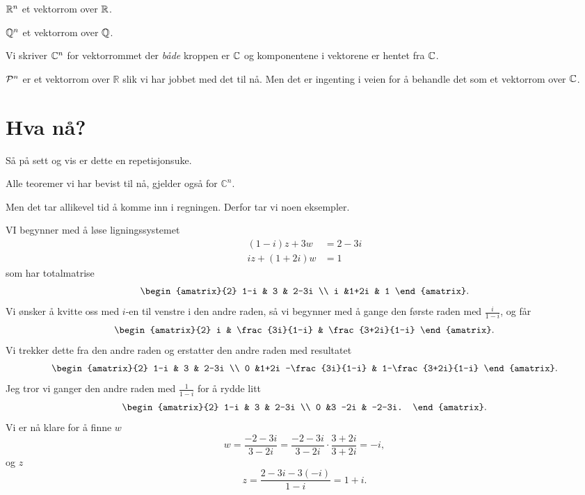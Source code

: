 \begin{ex}
$\R^n$ et vektorrom over $\R$.
\end{ex}
\begin{ex}
$\Q^n$ et vektorrom over $\Q$.
\end{ex}
\begin{ex}
Vi skriver $\C^n$ for vektorrommet der \emph{både} kroppen er $\C$ og komponentene i vektorene er hentet fra $\C$.
\end{ex}
\begin{ex}
$\P^n$ er et vektorrom over $\mathbb R$ slik vi har jobbet med det til nå. 
Men det er ingenting i veien for å behandle det som et vektorrom over $\C$.
\end{ex}





\section*{Hva nå?}


Så på sett og vis er dette en repetisjonsuke. 

\begin{thm}
Alle teoremer vi har bevist til nå, gjelder også for $\mathbb C^n$. 
\end{thm}

Men det tar allikevel tid å komme inn i regningen. Derfor tar vi noen eksempler.

\begin{ex}
VI begynner med å løse ligningssystemet
\begin{align*}
(1-i) z + 3w   &= 2-3i \\
i z + (1+2i) w &= 1
\end{align*}
som har totalmatrise
\[
\begin{amatrix}{2}
1-i & 3 & 2-3i \\ i &1+2i & 1
\end{amatrix}.
\]
Vi ønsker å kvitte oss med $i$-en til venstre i den andre raden, så vi begynner med å gange den første raden med $\frac{i}{1-i}$, og får
\[
\begin{amatrix}{2}
i & \frac{3i}{1-i} & \frac{3+2i}{1-i} 
\end{amatrix}.
\]
Vi trekker dette fra den andre raden og erstatter den andre raden med resultatet
\[
\begin{amatrix}{2}
1-i & 3 & 2-3i \\ 0 &1+2i -\frac{3i}{1-i} & 1-\frac{3+2i}{1-i} 
\end{amatrix}.
\]
Jeg tror vi ganger den andre raden med $\frac{1}{1-i}$ for å rydde litt
\[
\begin{amatrix}{2}
1-i & 3 & 2-3i \\ 0 &3 -2i  & -2-3i.
\end{amatrix}.
\]
Vi er nå klare for å finne $w$
\[
w=\frac{-2-3i}{3-2i}=\frac{-2-3i}{3-2i}\cdot \frac{3+2i}{3+2i}=-i,
\]
og $z$
\[
z=\frac{2-3i-3(-i)}{1-i}=1+i.
\]
\end{ex}

